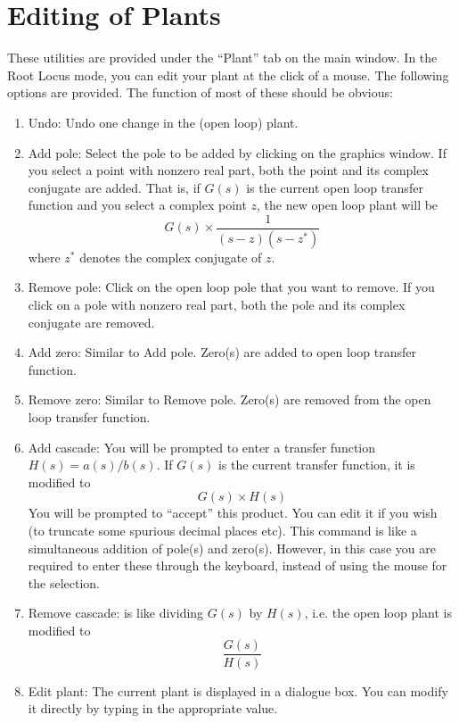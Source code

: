 \section{Editing of Plants}
\label{plant}
These utilities are provided under the ``Plant'' tab on the main window.
In the Root Locus mode, you can edit your plant at the click of a
mouse. The following options are provided. The function of most of
these should be obvious:
\begin{enumerate}
\item Undo: Undo one change in the (open loop) plant.
\item Add pole: Select the pole to be added by clicking on the
graphics window. If you select a point with nonzero real part, both
the point and its complex conjugate are added. That is, if $G(s)$ is
the current open loop transfer function and you select a complex point
$z$, the new open loop plant will be 
\[
G(s)\times \frac{1}{(s-z)(s-z^*)}
\]
where $z^*$ denotes the complex conjugate of $z$.
\item Remove pole: Click on the open loop pole that you want to
remove. If you click on a pole with nonzero real part, both the pole
and its complex conjugate are removed. 
\item Add zero: Similar to Add pole. Zero(s) are added to open loop
transfer function.
\item Remove zero: Similar to Remove pole. Zero(s) are removed from
the open loop transfer function.
\item Add cascade: You will be prompted to enter a transfer function 
$H(s)=a(s)/b(s)$. If $G(s)$ is the current transfer function, it is
modified to
\[G(s)\times H(s)\]
You will be prompted to ``accept'' this product. You can edit it if
you wish (to truncate some spurious decimal places etc). This command
is like a simultaneous addition of pole(s) and zero(s). However, in
this case you are required to enter these through the keyboard,
instead of using the mouse for the selection.
\item Remove cascade: is like dividing $G(s)$ by $H(s)$, i.e. the open
loop plant is modified to 
\[\frac{G(s)}{H(s)}\]
\item Edit plant: The current plant is displayed in a dialogue
box. You can modify it directly by typing in the appropriate value.
\end{enumerate}
